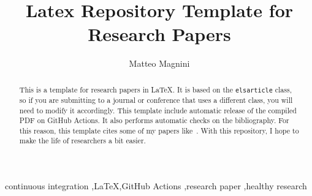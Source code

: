 \documentclass[final,5pt,times,twocolumn]{elsarticle}
\begin{document}
    \begin{frontmatter}
        \title{Latex Repository Template for Research Papers}

        \author[disi]{Matteo Magnini}


        \begin{abstract}
            This is a template for research papers in \LaTeX.
            It is based on the \texttt{elsarticle} class, so if you are submitting to a journal or conference that uses a different class, you will need to modify it accordingly.
            This template include automatic release of the compiled PDF on GitHub Actions.
            It also performs automatic checks on the bibliography.
            For this reason, this template cites some of my papers like~\cite{DBLP:conf/atal/MagniniCO22,DBLP:journals/logcom/MagniniCO23}.
            With this repository, I hope to make the life of researchers a bit easier.
        \end{abstract}

        \begin{keyword}
            continuous integration \sep \LaTeX \sep GitHub Actions \sep research paper \sep healthy research
        \end{keyword}

    \end{frontmatter}
\end{document}

